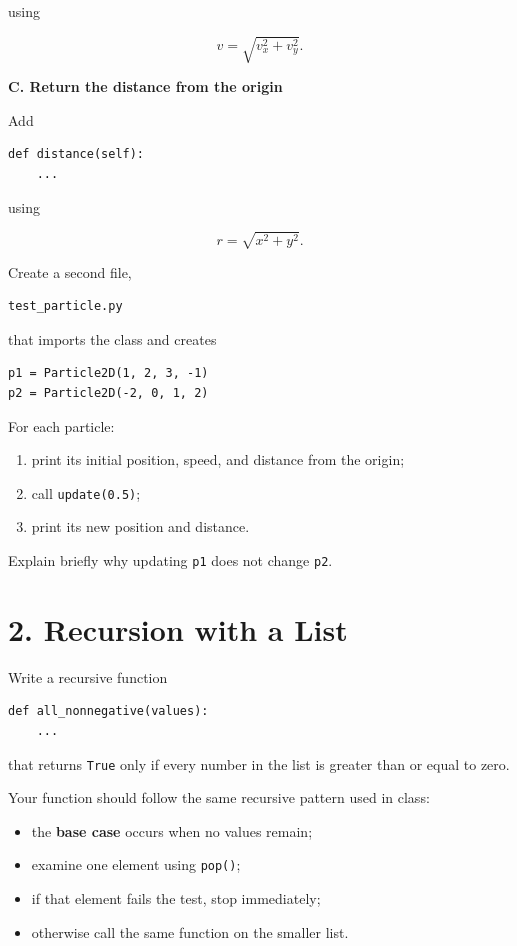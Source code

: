 \documentclass[11pt]{article}
\begin{document}
using

\[
v=\sqrt{v_x^2+v_y^2}.
\]

\textbf{C. Return the distance from the origin}

Add

\begin{lstlisting}
def distance(self):
    ...
\end{lstlisting}

using

\[
r=\sqrt{x^2+y^2}.
\]

Create a second file,

\begin{lstlisting}
test_particle.py
\end{lstlisting}

that imports the class and creates

\begin{lstlisting}
p1 = Particle2D(1, 2, 3, -1)
p2 = Particle2D(-2, 0, 1, 2)
\end{lstlisting}

For each particle:

\begin{enumerate}
\item print its initial position, speed, and distance from the origin;
\item call \texttt{update(0.5)};
\item print its new position and distance.
\end{enumerate}

Explain briefly why updating \texttt{p1} does not change \texttt{p2}.

\section*{2. Recursion with a List}

Write a recursive function

\begin{lstlisting}
def all_nonnegative(values):
    ...
\end{lstlisting}

that returns \texttt{True} only if every number in the list is greater
than or equal to zero.

Your function should follow the same recursive pattern used in class:

\begin{itemize}
\item the \textbf{base case} occurs when no values remain;
\item examine one element using \texttt{pop()};
\item if that element fails the test, stop immediately;
\item otherwise call the same function on the smaller list.
\end{itemize}
\end{document}
